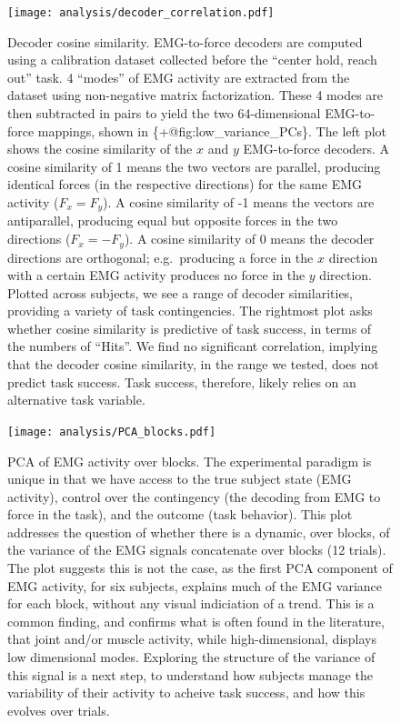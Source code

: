 \documentclass[../main.tex]{subfiles}
\begin{document}
\begin{figure}
\centering
\texttt{[image: analysis/decoder\_correlation.pdf]}
\caption{Decoder cosine similarity. EMG-to-force decoders are computed
using a calibration dataset collected before the ``center hold, reach
out'' task. 4 ``modes'' of EMG activity are extracted from the dataset
using non-negative matrix factorization. These 4 modes are then
subtracted in pairs to yield the two 64-dimensional EMG-to-force
mappings, shown in \{+@fig:low\_variance\_PCs\}. The left plot shows the
cosine similarity of the \(x\) and \(y\) EMG-to-force decoders. A cosine
similarity of 1 means the two vectors are parallel, producing identical
forces (in the respective directions) for the same EMG activity
(\(F_x = F_y\)). A cosine similarity of -1 means the vectors are
antiparallel, producing equal but opposite forces in the two directions
(\(F_x = -F_y\)). A cosine similarity of 0 means the decoder directions
are orthogonal; e.g.~producing a force in the \(x\) direction with a
certain EMG activity produces no force in the \(y\) direction. Plotted
across subjects, we see a range of decoder similarities, providing a
variety of task contingencies. The rightmost plot asks whether cosine
similarity is predictive of task success, in terms of the numbers of
``Hits''. We find no significant correlation, implying that the decoder
cosine similarity, in the range we tested, does not predict task
success. Task success, therefore, likely relies on an alternative task
variable.}\label{fig:decoder_correlations}
\end{figure}

\begin{figure}
\centering
\texttt{[image: analysis/PCA\_blocks.pdf]}
\caption{PCA of EMG activity over blocks. The experimental paradigm is
unique in that we have access to the true subject state (EMG activity),
control over the contingency (the decoding from EMG to force in the
task), and the outcome (task behavior). This plot addresses the question
of whether there is a dynamic, over blocks, of the variance of the EMG
signals concatenate over blocks (12 trials). The plot suggests this is
not the case, as the first PCA component of EMG activity, for six
subjects, explains much of the EMG variance for each block, without any
visual indiciation of a trend. This is a common finding, and confirms
what is often found in the literature, that joint and/or muscle
activity, while high-dimensional, displays low dimensional modes.
Exploring the structure of the variance of this signal is a next step,
to understand how subjects manage the variability of their activity to
acheive task success, and how this evolves over
trials.}\label{fig:behavior}
\end{figure}
\end{document}
